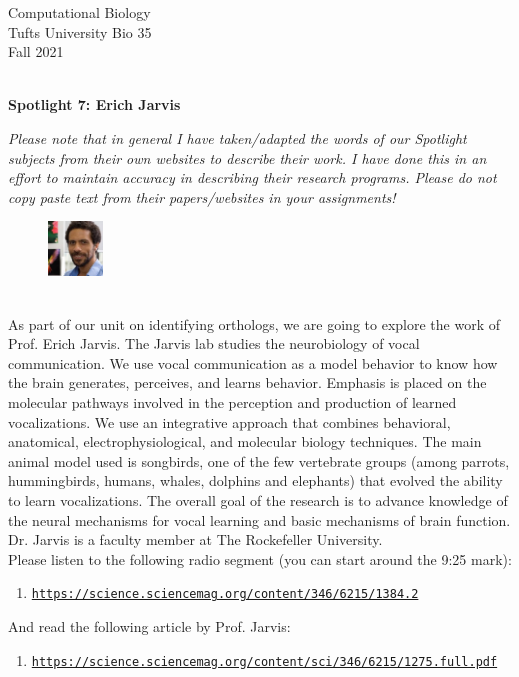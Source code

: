\documentclass{article}
\begin{document}
\BeginAccSupp{}
\begin{flushright}
Computational Biology ~\\
Tufts University Bio 35 ~\\
Fall 2021 ~\\ ~\\
\end{flushright}
\begin{center}{\textbf{\Large{Spotlight 7: Erich Jarvis}}}\end{center}

\textit{Please note that in general I have taken/adapted the words of our Spotlight subjects from their own websites to describe their work. I have done this in an effort to maintain accuracy in describing their research programs. Please do not copy paste text from their papers/websites in your assignments!}

\begin{figure}
\begin{center}
 \includegraphics[width=0.13\textwidth]{images/erich-jarvis.jpeg}
 \end{center}
\end{figure}
~\\ As part of our unit on identifying orthologs, we are going to explore the work of Prof. Erich Jarvis. The Jarvis lab studies the neurobiology of vocal communication. We use vocal communication as a model behavior to know how the brain generates, perceives, and learns behavior. Emphasis is placed on the molecular pathways involved in the perception and production of learned vocalizations. We use an integrative approach that combines behavioral, anatomical, electrophysiological, and molecular biology techniques. The main animal model used is songbirds, one of the few vertebrate groups (among parrots, hummingbirds, humans, whales, dolphins and elephants) that evolved the ability to learn vocalizations. The overall goal of the research is to advance knowledge of the neural mechanisms for vocal learning and basic mechanisms of brain function. Dr. Jarvis is a faculty member at The Rockefeller University.
~\\ 

Please listen to the following radio segment (you can start around the 9:25 mark):
\begin{enumerate}
\item \texttt{\href{https://science.sciencemag.org/content/346/6215/1384.2/}{https://science.sciencemag.org/content/346/6215/1384.2}}
\end{enumerate}
And read the following article by Prof. Jarvis: 
\begin{enumerate}
\item \texttt{\href{https://science.sciencemag.org/content/sci/346/6215/1275.full.pdf}{https://science.sciencemag.org/content/sci/346/6215/1275.full.pdf}}
\end{enumerate}
\end{document}
